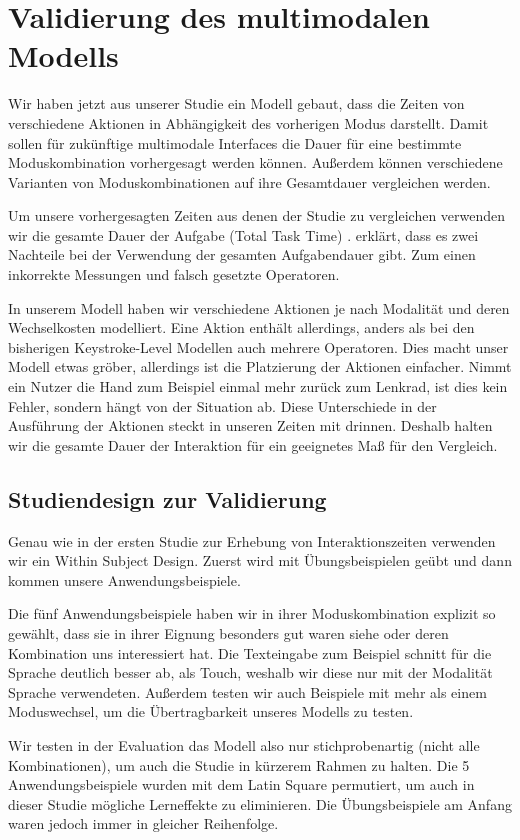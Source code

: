 \chapter[Validierung]{Validierung des multimodalen Modells}\label{cha:Evaluation}
Wir haben jetzt aus unserer Studie ein Modell gebaut, dass die Zeiten von verschiedene Aktionen in Abhängigkeit des vorherigen Modus darstellt. Damit sollen für zukünftige multimodale Interfaces die Dauer für eine bestimmte Moduskombination vorhergesagt werden können. Außerdem können verschiedene Varianten von Moduskombinationen auf ihre Gesamtdauer vergleichen werden. 

Um unsere vorhergesagten Zeiten aus denen der Studie zu vergleichen verwenden wir die gesamte Dauer der Aufgabe (Total Task Time) \citep{Teo:2006}. \citet{Teo:2006} erklärt, dass es zwei Nachteile bei der Verwendung der gesamten Aufgabendauer gibt. Zum einen inkorrekte Messungen und falsch gesetzte Operatoren. 

In unserem Modell haben wir verschiedene Aktionen je nach Modalität und deren Wechselkosten modelliert. Eine Aktion enthält allerdings, anders als bei den bisherigen Keystroke-Level Modellen auch mehrere Operatoren. Dies macht unser Modell etwas gröber, allerdings ist die Platzierung der Aktionen einfacher. Nimmt ein Nutzer die Hand zum Beispiel einmal mehr zurück zum Lenkrad, ist dies kein Fehler, sondern hängt von der Situation ab. Diese Unterschiede in der Ausführung der Aktionen steckt in unseren Zeiten mit drinnen. Deshalb halten wir die gesamte Dauer der Interaktion für ein geeignetes Maß für den Vergleich. 
\section[Studiendesign]{Studiendesign zur Validierung}
Genau wie in der ersten Studie zur Erhebung von Interaktionszeiten verwenden wir ein Within Subject Design. 
Zuerst wird mit Übungsbeispielen geübt und dann kommen unsere Anwendungsbeispiele. 

Die fünf Anwendungsbeispiele haben wir in ihrer Moduskombination explizit so gewählt, dass sie in ihrer Eignung besonders gut waren siehe  oder deren Kombination uns interessiert hat. Die Texteingabe zum Beispiel schnitt für die Sprache deutlich besser ab, als Touch, weshalb wir diese nur mit der Modalität Sprache verwendeten. Außerdem testen wir auch Beispiele mit mehr als einem Moduswechsel, um die Übertragbarkeit unseres Modells zu testen. 

Wir testen in der Evaluation das Modell also nur stichprobenartig (nicht alle Kombinationen), um auch die Studie in kürzerem Rahmen zu halten. Die 5 Anwendungsbeispiele wurden mit dem Latin Square permutiert, um auch in dieser Studie mögliche Lerneffekte zu eliminieren. Die Übungsbeispiele am Anfang waren jedoch immer in gleicher Reihenfolge. 
